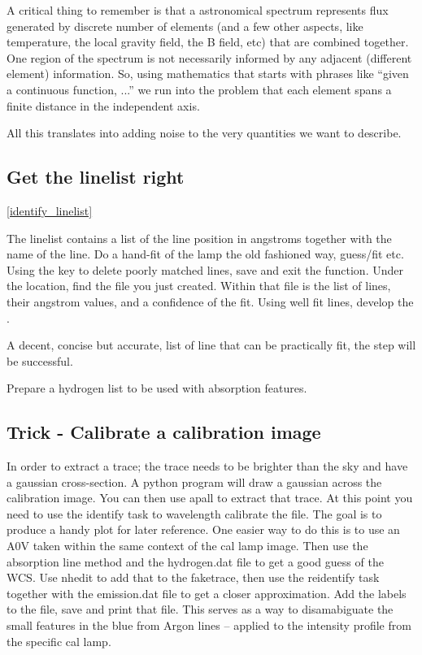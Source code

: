 A critical thing to remember is that a astronomical spectrum represents flux generated
by discrete number of elements (and a few other aspects, like temperature, the local
gravity field, the B field, etc) that are combined together. One region of the
spectrum is not necessarily informed by any adjacent (different element) information.
So, using mathematics that starts with phrases like ``given a continuous function, ...''
we run into the problem that each element spans a finite distance in the independent
axis. 

All this translates into adding noise to the very quantities we want to describe.

\subsection{Get the linelist right} \ref{identify_linelist}

The linelist  contains a list of the line position
in angstroms together with the name of the line. Do a hand-fit of the lamp
the old fashioned way, guess/fit etc. Using the  key to delete
poorly matched lines, save and exit the function. Under the 
location, find the file you just created. Within that file is the list of
lines, their angstrom values, and a confidence of the fit. Using well fit
lines, develop the .

A decent, concise but accurate, list of line that can be practically fit,
the  step will be successful. 

Prepare a hydrogen list to be used with absorption features.

\subsection{Trick - Calibrate a calibration image}

In order to extract a trace; the trace needs to be brighter than the sky and
have a gaussian cross-section. A python program 
will draw a gaussian across the calibration image. You can then use apall to
extract that trace. At this point you need to use the identify task to wavelength
calibrate the file. The goal is to produce a handy plot for later reference.
One easier way to do this is to use an A0V taken within the same context of
the cal lamp image. Then use the absorption line method and the hydrogen.dat
file to get a good guess of the WCS. Use nhedit to add that to the faketrace,
then use the reidentify task together with the emission.dat file to get
a closer approximation. Add the labels to the file, save and print that
file. This serves as a way to disamabiguate the small features in the blue
from Argon lines -- applied to the intensity profile from the specific cal lamp.


